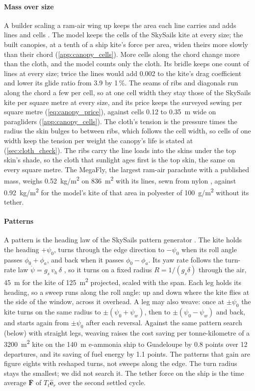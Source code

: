 \paragraph{Mass over size} A builder scaling a ram-air wing up keeps the area each line carries and adds lines and cells \citep{dunker2013}. The model keeps the cells of the SkySails kite at every size; the built canopies, at a tenth of a ship kite's force per area, widen theirs more slowly than their chord (\cref{app:canopy_cells}). More cells along the chord change more than the cloth, and the model counts only the cloth. Its bridle keeps one count of lines at every size; twice the lines would add 0.002 to the kite's drag coefficient and lower its glide ratio from 3.9 by 1\,\%. The seams of ribs and diagonals run along the chord a few per cell, so at one cell width they stay those of the SkySails kite per square metre at every size, and its price keeps the surveyed sewing per square metre (\cref{eq:canopy_price}), against cells 0.12 to \SI{0.35}{m} wide on paragliders (\cref{app:canopy_cells}). The cloth's tension is the pressure times the radius the skin bulges to between ribs, which follows the cell width, so cells of one width keep the tension per weight the canopy's life is stated at (\cref{sec:cloth_check}). The ribs carry the line loads into the skins under the top skin's shade, so the cloth that sunlight ages first is the top skin, the same on every square metre. The MegaFly, the largest ram-air parachute with a published mass, weighs \SI{0.52}{kg/m^2} on \SI{836}{m^2} with its lines, sewn from nylon \citep{dunker2007}, against \SI{0.92}{kg/m^2} for the model's kite of that area in polyester of \SI{100}{g/m^2} without its tether.


\paragraph{Patterns} A pattern is the heading law of the SkySails pattern generator \citep[Sec.~VIII]{erhard2013}. The kite holds the heading $+\psi_0$, turns through the edge direction to $-\psi_0$ when its roll angle passes $\phi_0+\phi_a$, and back when it passes $\phi_0-\phi_a$. Its yaw rate follows the turn-rate law $\dot\psi = g_s\,v_h\,\delta$ \citep[Eq.~7]{erhard2013}, so it turns on a fixed radius $R = 1/(g_s\delta)$ through the air, \SI{45}{m} for the kite of \SI{125}{m^2} projected, scaled with the span. Each leg holds its heading, so a sweep runs along the roll angle: up and down where the kite flies at the side of the window, across it overhead. A leg may also weave: once at $\pm\psi_0$ the kite turns on the same radius to $\pm(\psi_0+\psi_w)$, then to $\pm(\psi_0-\psi_w)$ and back, and starts again from $\pm\psi_0$ after each reversal. Against the same pattern search (below) with straight legs, weaving raises the cost saving per tonne-kilometre of a \SI{3200}{m^2} kite on the \SI{140}{m} e-ammonia ship to Guadeloupe by 0.8 points over 12 departures, and its saving of fuel energy by 1.1 points. The patterns that gain are figure eights with reshaped turns, not sweeps along the edge. The turn radius stays the smallest; we did not search it. The tether force on the ship is the time average $\overline{\mathbf F}$ of $T_t\hat{\mathbf e}_r$ over the second settled cycle.

